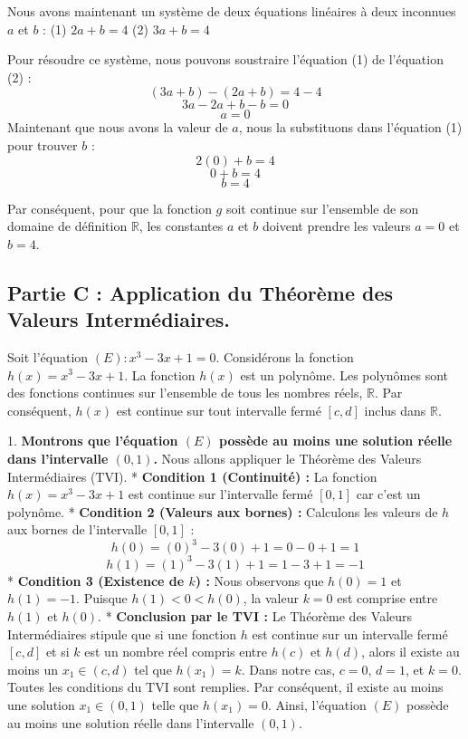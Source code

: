 \documentclass[12pt,a4paper]{report}
\begin{document}
    Nous avons maintenant un système de deux équations linéaires à deux inconnues $a$ et $b$ :
    (1) $2a + b = 4$
    (2) $3a + b = 4$

    Pour résoudre ce système, nous pouvons soustraire l'équation (1) de l'équation (2) :
    $$ (3a + b) - (2a + b) = 4 - 4 $$
    $$ 3a - 2a + b - b = 0 $$
    $$ a = 0 $$
    Maintenant que nous avons la valeur de $a$, nous la substituons dans l'équation (1) pour trouver $b$ :
    $$ 2(0) + b = 4 $$
    $$ 0 + b = 4 $$
    $$ b = 4 $$

    Par conséquent, pour que la fonction $g$ soit continue sur l'ensemble de son domaine de définition $\mathbb{R}$, les constantes $a$ et $b$ doivent prendre les valeurs $a = 0$ et $b = 4$.

\subsection{Partie C : Application du Théorème des Valeurs Intermédiaires.}

Soit l'équation $(E) : x^3 - 3x + 1 = 0$.
Considérons la fonction $h(x) = x^3 - 3x + 1$.
La fonction $h(x)$ est un polynôme. Les polynômes sont des fonctions continues sur l'ensemble de tous les nombres réels, $\mathbb{R}$. Par conséquent, $h(x)$ est continue sur tout intervalle fermé $[c, d]$ inclus dans $\mathbb{R}$.

1.  \textbf{Montrons que l'équation $(E)$ possède au moins une solution réelle dans l'intervalle $(0, 1)$.}
    Nous allons appliquer le Théorème des Valeurs Intermédiaires (TVI).
    *   \textbf{Condition 1 (Continuité) :} La fonction $h(x) = x^3 - 3x + 1$ est continue sur l'intervalle fermé $[0, 1]$ car c'est un polynôme.
    *   \textbf{Condition 2 (Valeurs aux bornes) :} Calculons les valeurs de $h$ aux bornes de l'intervalle $[0, 1]$ :
        $$ h(0) = (0)^3 - 3(0) + 1 = 0 - 0 + 1 = 1 $$
        $$ h(1) = (1)^3 - 3(1) + 1 = 1 - 3 + 1 = -1 $$
    *   \textbf{Condition 3 (Existence de $k$) :} Nous observons que $h(0) = 1$ et $h(1) = -1$. Puisque $h(1) < 0 < h(0)$, la valeur $k=0$ est comprise entre $h(1)$ et $h(0)$.
    *   \textbf{Conclusion par le TVI :} Le Théorème des Valeurs Intermédiaires stipule que si une fonction $h$ est continue sur un intervalle fermé $[c, d]$ et si $k$ est un nombre réel compris entre $h(c)$ et $h(d)$, alors il existe au moins un $x_1 \in (c, d)$ tel que $h(x_1) = k$.
        Dans notre cas, $c=0$, $d=1$, et $k=0$. Toutes les conditions du TVI sont remplies.
        Par conséquent, il existe au moins une solution $x_1 \in (0, 1)$ telle que $h(x_1) = 0$.
    Ainsi, l'équation $(E)$ possède au moins une solution réelle dans l'intervalle $(0, 1)$.
\end{document}
